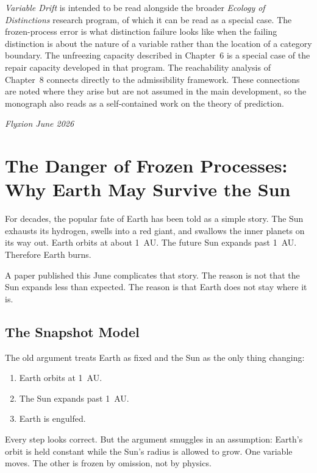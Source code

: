 \documentclass[11pt]{book}
\theoremstyle{plain}
\theoremstyle{definition}
\theoremstyle{remark}
\begin{document}
\emph{Variable Drift} is intended to be read alongside the broader \emph{Ecology of Distinctions} research program, of which it can be read as a special case. The frozen-process error is what distinction failure looks like when the failing distinction is about the nature of a variable rather than the location of a category boundary. The unfreezing capacity described in Chapter~6 is a special case of the repair capacity developed in that program. The reachability analysis of Chapter~8 connects directly to the admissibility framework. These connections are noted where they arise but are not assumed in the main development, so the monograph also reads as a self-contained work on the theory of prediction.

\vfill
\noindent\textit{Flyxion \hfill June 2026}
\clearpage

\chapter[The Danger of Frozen Processes]{The Danger of Frozen Processes: Why Earth May Survive the Sun}

For decades, the popular fate of Earth has been told as a simple story. The Sun exhausts its hydrogen, swells into a red giant, and swallows the inner planets on its way out. Earth orbits at about 1~AU. The future Sun expands past 1~AU. Therefore Earth burns.

A paper published this June complicates that story. The reason is not that the Sun expands less than expected. The reason is that Earth does not stay where it is.

\section{The Snapshot Model}

The old argument treats Earth as fixed and the Sun as the only thing changing:
\begin{enumerate}[itemsep=1pt]
\item Earth orbits at 1~AU.
\item The Sun expands past 1~AU.
\item Earth is engulfed.
\end{enumerate}
Every step looks correct. But the argument smuggles in an assumption: Earth's orbit is held constant while the Sun's radius is allowed to grow. One variable moves. The other is frozen by omission, not by physics.
\end{document}
